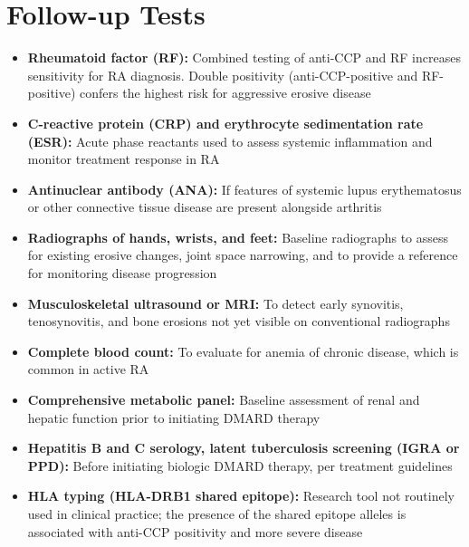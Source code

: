 \section*{Follow-up Tests}
\begin{itemize}
  \item \textbf{Rheumatoid factor (RF):} Combined testing of anti-CCP and RF increases sensitivity for RA diagnosis. Double positivity (anti-CCP-positive and RF-positive) confers the highest risk for aggressive erosive disease
  \item \textbf{C-reactive protein (CRP) and erythrocyte sedimentation rate (ESR):} Acute phase reactants used to assess systemic inflammation and monitor treatment response in RA
  \item \textbf{Antinuclear antibody (ANA):} If features of systemic lupus erythematosus or other connective tissue disease are present alongside arthritis
  \item \textbf{Radiographs of hands, wrists, and feet:} Baseline radiographs to assess for existing erosive changes, joint space narrowing, and to provide a reference for monitoring disease progression
  \item \textbf{Musculoskeletal ultrasound or MRI:} To detect early synovitis, tenosynovitis, and bone erosions not yet visible on conventional radiographs
  \item \textbf{Complete blood count:} To evaluate for anemia of chronic disease, which is common in active RA
  \item \textbf{Comprehensive metabolic panel:} Baseline assessment of renal and hepatic function prior to initiating DMARD therapy
  \item \textbf{Hepatitis B and C serology, latent tuberculosis screening (IGRA or PPD):} Before initiating biologic DMARD therapy, per treatment guidelines
  \item \textbf{HLA typing (HLA-DRB1 shared epitope):} Research tool not routinely used in clinical practice; the presence of the shared epitope alleles is associated with anti-CCP positivity and more severe disease
\end{itemize}

